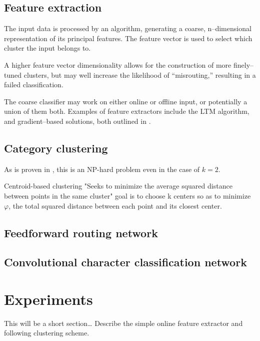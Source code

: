 \documentclass[10pt,conference,a4paper]{IEEEtran}
\begin{document}
	\subsection{Feature extraction}

	The input data is processed by an algorithm, generating a coarse, n--dimensional representation of its principal features.
	The feature vector is used to select which cluster the input belongs to.
	

	A higher feature vector dimensionality allows for the construction of more finely--tuned clusters, but may well increase
	the likelihood of ``misrouting,'' resulting in a failed classification.

	The coarse classifier may work on either online or offline input, or potentially a union of them both.
	Examples of feature extractors include the LTM algorithm, and gradient--based solutions, both outlined in \cite{tanaka1999hybrid}.



	\subsection{Category clustering}

	As is proven in \cite{drineas2004clustering}, this is an NP-hard problem even in the case of $k = 2$. 

	Centroid-based clustering
	"Seeks to minimize the average squared distance between points in the same cluster"
	goal is to choose k centers so as to minimize $\varphi$, the total squared distance between each point and its closest center.

	\subsection{Feedforward routing network}


	\subsection{Convolutional character classification network}


	\section{Experiments}

	This will be a short section\ldots
	Describe the simple online feature extractor and following clustering scheme.
\end{document}
